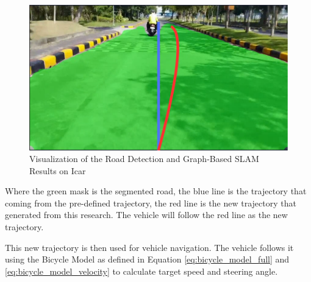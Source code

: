 \begin{figure}[H]
	\centering
	\includegraphics[width=\linewidth]{../konten/contoh_hasil_edited.png}
	\caption{Visualization of the Road Detection and Graph-Based SLAM Results on Icar}
	\label{fig:nav_visualize_contoh}
\end{figure} 
Where the green mask is the segmented road, the blue line is the trajectory that coming from the pre-defined trajectory, the red line is the new trajectory that generated from this research. The vehicle will follow the red line as the new trajectory. 

\par 
This new trajectory is then used for vehicle navigation. The vehicle follows it using the Bicycle Model as defined in Equation \ref{eq:bicycle_model_full} and \ref{eq:bicycle_model_velocity} to calculate target speed and steering angle.
